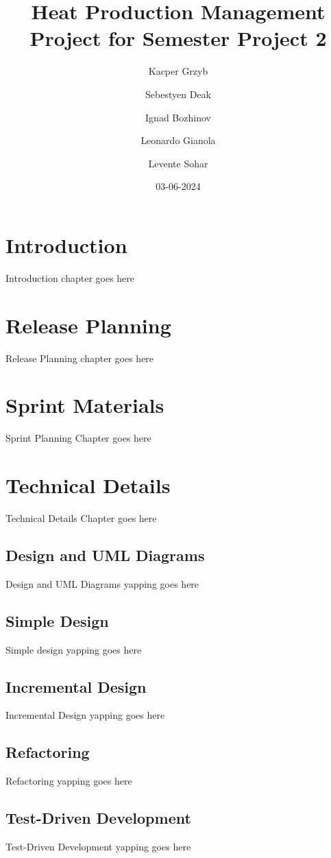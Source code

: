 \documentclass[12pt]{report}
\title{Heat Production Management Project for Semester Project 2}
\author{Kacper Grzyb \and Sebestyen Deak \and Ignad Bozhinov \and Leonardo Gianola \and Levente Sohar}
\date{03-06-2024}
\begin{document}
\maketitle

\tableofcontents

\chapter{Introduction}
Introduction chapter goes here

\chapter{Release Planning}
Release Planning chapter goes here

\chapter{Sprint Materials}
Sprint Planning Chapter goes here

\chapter{Technical Details}
Technical Details Chapter goes here

\section{Design and UML Diagrams}
Design and UML Diagrams yapping goes here

\section{Simple Design}
Simple design yapping goes here

\section{Incremental Design}
Incremental Design yapping goes here

\section{Refactoring}
Refactoring yapping goes here

\section{Test-Driven Development}
Test-Driven Development yapping goes here
\end{document}
